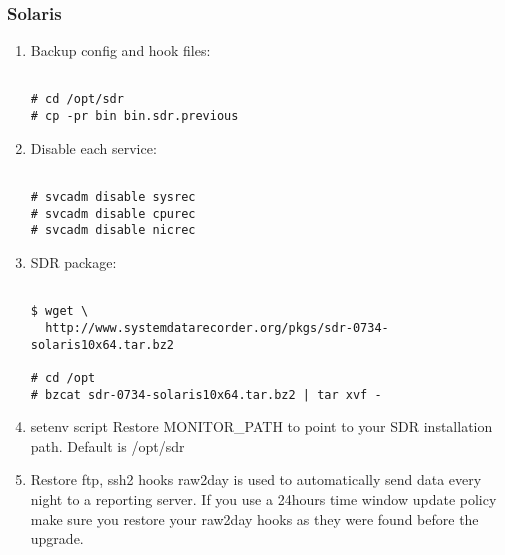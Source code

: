 \subsubsection*{Solaris}

\begin{enumerate}

\item Backup config and hook files:
\begin{Verbatim}[fontsize=\relsize{-2},frame=single,
                 label=\fbox{SDR Upgrading procedure},
                 framesep=3mm,labelposition=bottomline]

# cd /opt/sdr
# cp -pr bin bin.sdr.previous

\end{Verbatim}


\item Disable each service:
\begin{Verbatim}[fontsize=\relsize{-2},frame=single,
                 label=\fbox{Disable Services},
                 framesep=3mm,labelposition=bottomline]

# svcadm disable sysrec
# svcadm disable cpurec
# svcadm disable nicrec

\end{Verbatim}


\item SDR package:

\begin{Verbatim}[fontsize=\relsize{-2},frame=single,
                 label=\fbox{Installation Package},
                 framesep=3mm,labelposition=bottomline]

$ wget \
  http://www.systemdatarecorder.org/pkgs/sdr-0734-solaris10x64.tar.bz2

# cd /opt
# bzcat sdr-0734-solaris10x64.tar.bz2 | tar xvf -

\end{Verbatim}

\item setenv script
\noindent
Restore MONITOR\_PATH to point to your SDR installation
path. Default is /opt/sdr

\item Restore ftp, ssh2 hooks
\noindent
raw2day is used to automatically send data every night 
to a reporting server. If you use a 24hours time window 
update policy make sure you restore your raw2day hooks 
as they were found before the upgrade.

\end{enumerate}






